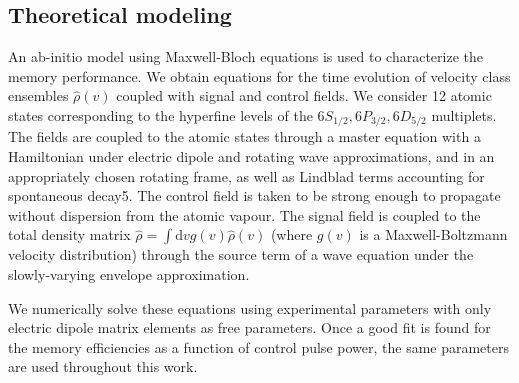 \subsection*{Theoretical modeling}

An ab-initio model using Maxwell-Bloch equations is used to characterize the memory performance. We obtain equations for the time evolution of  velocity class ensembles $\hat{\rho}(v)$ coupled with signal and control fields. We consider 12 atomic states corresponding to the hyperfine levels of the $6S_{1/2}, 6P_{3/2}, 6D_{5/2}$ multiplets. The fields are coupled to the atomic states through a master equation with a Hamiltonian under electric dipole and rotating wave approximations, and in an appropriately chosen rotating frame, as well as Lindblad terms accounting for spontaneous decay5. The control field is taken to be strong enough to propagate without dispersion from the atomic vapour. The signal field is coupled to the total density matrix $\hat{\rho}=\int \mathrm{d}v g(v) \hat{\rho}(v)$ (where $g(v)$ is a Maxwell-Boltzmann velocity distribution) through the source term of a wave equation under the slowly-varying envelope approximation.

We numerically solve these equations using experimental parameters with only electric dipole matrix elements as free parameters. Once a good fit is found for the memory efficiencies as a function of control pulse power, the same parameters are used throughout this work.
